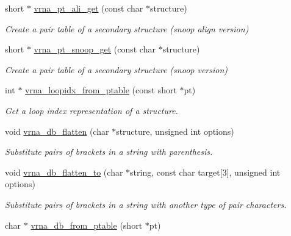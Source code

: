 \begin{DoxyCompactItemize}
\mbox{\label{group__struct__utils_ga1ee4cdcda1f57d32dcb38032116d335d}} 
short $\ast$ \hyperlink{group__struct__utils_ga1ee4cdcda1f57d32dcb38032116d335d}{vrna\+\_\+pt\+\_\+ali\+\_\+get} (const char $\ast$structure)
\begin{DoxyCompactList}\small\item\em Create a pair table of a secondary structure (snoop align version) \end{DoxyCompactList}\item 
short $\ast$ \hyperlink{group__struct__utils_gaef0f7e1a6c00c81a349973de53039dda}{vrna\+\_\+pt\+\_\+snoop\+\_\+get} (const char $\ast$structure)
\begin{DoxyCompactList}\small\item\em Create a pair table of a secondary structure (snoop version) \end{DoxyCompactList}\item 
\mbox{\label{group__struct__utils_ga03e15af299be0866ff21da880c74b92e}} 
int $\ast$ \hyperlink{group__struct__utils_ga03e15af299be0866ff21da880c74b92e}{vrna\+\_\+loopidx\+\_\+from\+\_\+ptable} (const short $\ast$pt)
\begin{DoxyCompactList}\small\item\em Get a loop index representation of a structure. \end{DoxyCompactList}\item 
void \hyperlink{group__struct__utils_gae966b9f44168a4f4b39ca42ffb5f37b7}{vrna\+\_\+db\+\_\+flatten} (char $\ast$structure, unsigned int options)
\begin{DoxyCompactList}\small\item\em Substitute pairs of brackets in a string with parenthesis. \end{DoxyCompactList}\item 
void \hyperlink{group__struct__utils_ga690425199c8b71545e7196e3af1436f8}{vrna\+\_\+db\+\_\+flatten\+\_\+to} (char $\ast$string, const char target\mbox{[}3\mbox{]}, unsigned int options)
\begin{DoxyCompactList}\small\item\em Substitute pairs of brackets in a string with another type of pair characters. \end{DoxyCompactList}\item 
char $\ast$ \hyperlink{group__struct__utils_gaf9ecd0d7877fecdbb0292e24f40283d5}{vrna\+\_\+db\+\_\+from\+\_\+ptable} (short $\ast$pt)

\end{DoxyCompactItemize}
